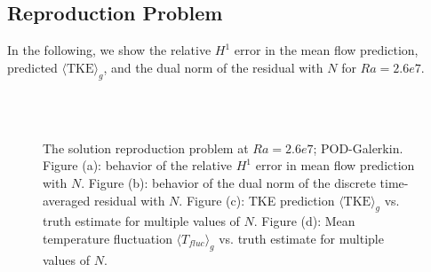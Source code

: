 \subsection{Reproduction Problem}
In the following, we show the relative $H^1$ error in the mean
flow prediction, predicted $\langle \text{TKE} \rangle_g$, and
the dual norm of the residual with $N$ for $Ra=2.6e7$.
\begin{figure}[H] \centering 
   \hspace{1.5em}
   \\
   \hspace{1.5em}
   \\
   \hspace{1.5em}
\caption{The solution reproduction problem at $Ra=2.6e7$;
   POD-Galerkin. Figure (a): behavior of the relative $H^1$
   error in mean flow prediction with $N$.  Figure (b):
   behavior of the dual norm of the discrete time-averaged
   residual with $N$.
   Figure (c): TKE prediction $\langle \text{TKE} \rangle_g$
   vs. truth estimate for multiple values of $N$.
   Figure (d): Mean temperature fluctuation $\langle T_{fluc}
   \rangle_g$ vs. truth estimate for multiple values of $N$.}
\label{fig:slotr2_ra2.6e7_qois} \end{figure}

